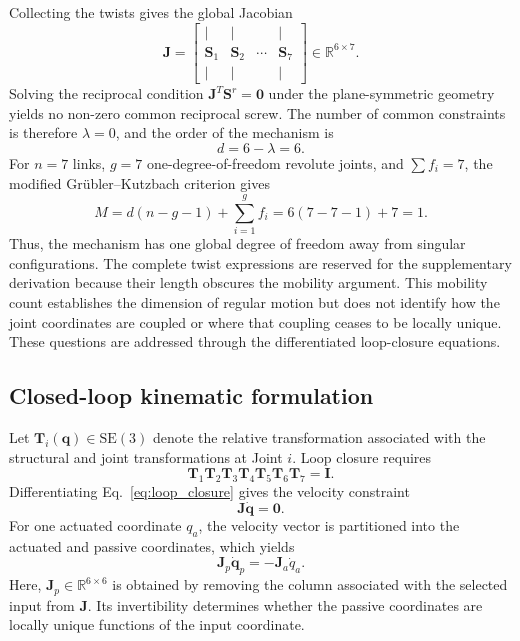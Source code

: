 ﻿\documentclass[a4paper,fleqn]{cas-sc}
\begin{document}
Collecting the twists gives the global Jacobian
\begin{equation}
\mathbf J=
\begin{bmatrix}
|&|&&|\\
\mathbf S_1&\mathbf S_2&\cdots&\mathbf S_7\\
|&|&&|
\end{bmatrix}\in\mathbb R^{6\times7}.
\label{eq:global_jacobian}
\end{equation}
Solving the reciprocal condition
\(\mathbf J^T\mathbf S^r=\mathbf 0\) under the plane-symmetric geometry yields
no non-zero common reciprocal screw. The number of common constraints is
therefore \(\lambda=0\), and the order of the mechanism is
\begin{equation}
d=6-\lambda=6.
\end{equation}
For \(n=7\) links, \(g=7\) one-degree-of-freedom revolute joints, and
\(\sum f_i=7\), the modified Gr\"ubler--Kutzbach criterion gives
\begin{equation}
M=d(n-g-1)+\sum_{i=1}^{g}f_i
  =6(7-7-1)+7=1.
\label{eq:mobility}
\end{equation}
Thus, the mechanism has one global degree of freedom away from singular
configurations. The complete twist expressions are reserved for the
supplementary derivation because their length obscures the mobility argument.
This mobility count establishes the dimension of regular motion but does not
identify how the joint coordinates are coupled or where that coupling ceases
to be locally unique. These questions are addressed through the differentiated
loop-closure equations.

\subsection{Closed-loop kinematic formulation}

Let \(\mathbf T_i(\mathbf q)\in\mathrm{SE}(3)\) denote the relative
transformation associated with the structural and joint transformations at
Joint \(i\). Loop closure requires
\begin{equation}
\mathbf T_1\mathbf T_2\mathbf T_3\mathbf T_4
\mathbf T_5\mathbf T_6\mathbf T_7=\mathbf I.
\label{eq:loop_closure}
\end{equation}
Differentiating Eq.~\eqref{eq:loop_closure} gives the velocity constraint
\begin{equation}
\mathbf J\dot{\mathbf q}=\mathbf 0.
\label{eq:velocity_constraint}
\end{equation}
For one actuated coordinate \(q_a\), the velocity vector is partitioned into
the actuated and passive coordinates, which yields
\begin{equation}
\mathbf J_p\dot{\mathbf q}_p=-\mathbf J_a\dot q_a.
\label{eq:passive_jacobian}
\end{equation}
Here, \(\mathbf J_p\in\mathbb R^{6\times6}\) is obtained by removing the
column associated with the selected input from \(\mathbf J\). Its
invertibility determines whether the passive coordinates are locally unique
functions of the input coordinate.
\end{document}
